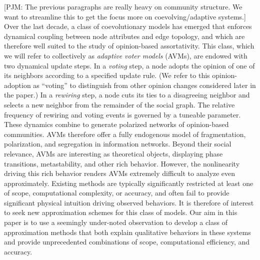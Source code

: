 \documentclass[review, onefignum, onetabnum]{siamart171218}
\newcommand{\pjm}[1]{{\color{blue}[PJM: #1]}}
\begin{document}
\pjm{The previous paragraphs are really heavy on community structure. We want to streamline this to get the focus more on coevolving/adaptive systems.}
	Over the last decade, a class of coevolutionary models has emerged that enforces dynamical coupling between node attributes and edge topology, and which are therefore well suited to the study of opinion-based assortativity.
	This class, which we will refer to collectively as \emph{adaptive voter models} (AVMs), are endowed with two dynamical update steps. 
	In a \emph{voting} step, a node adopts the opinion of one of its neighbors according to a specified update rule. (We refer to this opinion-adoption as ``voting'' to distinguish from other opinion changes considered later in the paper.)
	In a \emph{rewiring} step, a node cuts its ties to a disagreeing neighbor and selects a new neighbor from the remainder of the social graph. 
	The relative frequency of rewiring and voting events is governed by a tuneable parameter. 
	These dynamics combine to generate polarized networks of opinion-based communities. 
	AVMs therefore offer a fully endogenous model of fragmentation, polarization, and segregation in information networks. 
	Beyond their social relevance, AVMs are interesting as theoretical objects, displaying phase transitions, metastability, and other rich behavior. 
	However, the nonlinearity driving this rich behavior renders AVMs extremely difficult to analyze even approximately. 
	Existing methods are typically significantly restricted at least one of scope, computational complexity, or accuracy, and often fail to provide significant physical intuition driving observed behaviors. 
	It is therefore of interest to seek new approximation schemes for this class of models. 
	Our aim in this paper is to use a seemingly under-noted observation to develop a class of approximation methods that both explain qualitative behaviors in these systems and provide unprecedented combinations of scope, computational efficiency, and accuracy. 
\end{document}
